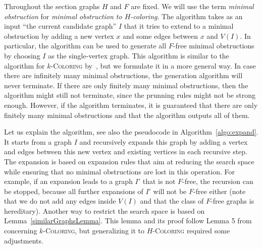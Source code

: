 \documentclass[11pt,a4paper]{article}
\theoremstyle{mystyle}
\newcommand{\colo}[1]{\ensuremath{#1}-\textsc{Coloring}\xspace}
\begin{document}
Throughout the section graphs $H$ and $F$ are fixed. We will use the term \emph{minimal obstruction} for \emph{minimal obstruction to $H$-coloring}.
The algorithm takes as an input ``the current candidate graph'' $I$ that it tries to extend to a minimal obstruction by adding a new vertex $x$ and some edges between $x$ and $V(I)$.
 In particular, the algorithm can be used to generate all $F$-free minimal obstructions by choosing $I$ as the single-vertex graph. This algorithm is similar to the algorithm for \colo{k} by~\cite{DBLP:journals/jgt/GoedgebeurS18}, but we formulate it in a more general way.
 In case there are infinitely many minimal obstructions, the generation algorithm will never terminate.
 If there are only finitely many minimal obstructions, then the algorithm might still not terminate, since the prunning rules might not be strong enough. 
 However, if the algorithm terminates, it is guaranteed that there are only finitely many minimal obstructions and that the algorithm outputs all of them.

Let us explain the algorithm, see also the pseudocode in Algorithm~\ref{algo:expand}.
It starts from a graph $I$ and recursively expands this graph by adding a vertex and edges between this new vertex and existing vertices in each recursive step.
The expansion is based on expansion rules that aim at reducing the search space while ensuring that no minimal obstructions are lost in this operation.
For example, if an expansion leads to a graph $I'$ that is not $F$-free, the recursion can be stopped, because all further expansions of $I'$ will not be $F$-free either (note that we do not add any edges inside $V(I)$ and that the class of $F$-free graphs is hereditary).
Another way to restrict the search space is based on Lemma~\ref{similarGraphsLemma}.
This lemma and its proof follow Lemma 5 from~\cite{DBLP:journals/jct/ChudnovskyGSZ20} concerning \colo{k}, but generalizing it to \colo{H} required some adjustments.
\end{document}
